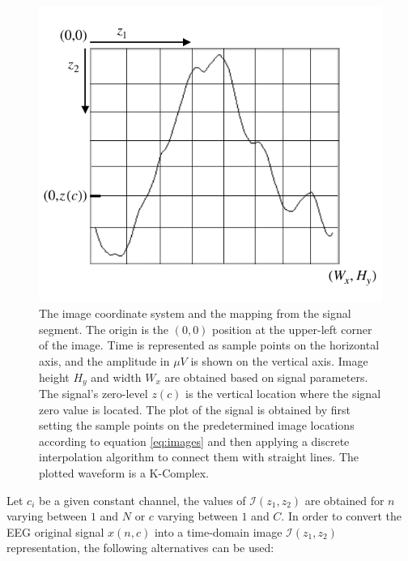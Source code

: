 \begin{figure}[h!]
\centering
\includegraphics[scale=1.2]{images/imagecoordinatesystem.pdf}
\caption[Image Coordinate System]{The image coordinate system and the mapping from the signal segment.  The origin is the $(0,0)$ position at the upper-left corner of the image.  Time is represented as sample points on the horizontal axis, and the amplitude in $\mu V$ is shown on the vertical axis. Image height $H_y$ and width $W_x$ are obtained based on signal parameters.  The signal's zero-level $z(c)$ is the vertical location where the signal zero value is located. The plot of the signal is obtained by first setting the sample points on the predetermined image locations according to equation \ref{eq:images} and then applying a discrete interpolation algorithm to connect them with straight lines. The plotted waveform is a K-Complex.}
\label{fig:imagecoordinatesystem}
\end{figure}


Let $c_i$ be a given constant channel, the values of $\mathcal{I}(z_1,z_2)$ are obtained for $n$ varying between $1$ and $N$ or $c$ varying between $1$ and $C$.   In order to convert the EEG original signal $x(n,c)$ into a time-domain image $\mathcal{I}(z_1,z_2)$ representation, the following alternatives can be used:

